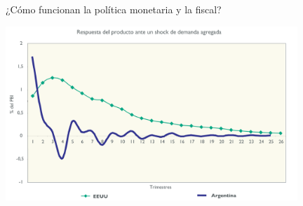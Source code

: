 \documentclass{beamer}
\begin{document}

\begin{frame}{¿Cómo funcionan la política monetaria y la fiscal?}
    
    \centering\includegraphics[width=11cm]{P81.png}\

\end{frame}


    

       
            

 


\end{document}
